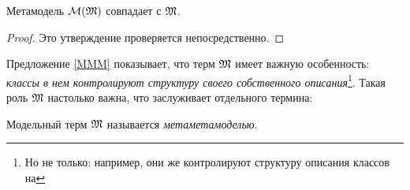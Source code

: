 \begin{Prop}\label{MMM}
Метамодель $\mathcal{M}(\mathfrak{M})$ совпадает с $\mathfrak{M}$.
\end{Prop}
\begin{proof}
Это утверждение проверяется непосредственно.
\end{proof}

Предложение \ref{MMM} показывает, что терм $\mathfrak{M}$ имеет важную особенность: \emph{классы в нем контролируют структуру своего собственного описания}\footnote{Но не только: например, они же контролируют структуру описания классов на }.
Такая роль $\mathfrak{M}$ настолько важна, что заслуживает отдельного термина:
\begin{Def}[Метаметамодель]
Модельный терм $\mathfrak{M}$ называется \emph{метаметамоделью}.
\end{Def}

